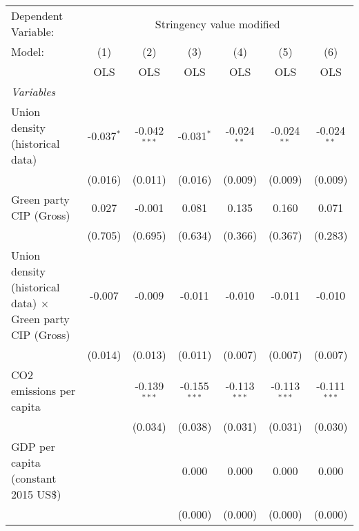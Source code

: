 
\begingroup
\centering
\begin{tabular}{lcccccc}
   \toprule
   Dependent Variable: & \multicolumn{6}{c}{Stringency value modified}\\
   Model:                                                            & (1)          & (2)            & (3)            & (4)            & (5)            & (6)\\  
                                                                     &  OLS         & OLS            & OLS            & OLS            & OLS            & OLS\\  
   \midrule
   \emph{Variables}\\
   Union density (historical data)                                   & -0.037$^{*}$ & -0.042$^{***}$ & -0.031$^{*}$   & -0.024$^{**}$  & -0.024$^{**}$  & -0.024$^{**}$\\   
                                                                     & (0.016)      & (0.011)        & (0.016)        & (0.009)        & (0.009)        & (0.009)\\   
   Green party CIP (Gross)                                           & 0.027        & -0.001         & 0.081          & 0.135          & 0.160          & 0.071\\   
                                                                     & (0.705)      & (0.695)        & (0.634)        & (0.366)        & (0.367)        & (0.283)\\   
   Union density (historical data) $\times$ Green party CIP (Gross)  & -0.007       & -0.009         & -0.011         & -0.010         & -0.011         & -0.010\\   
                                                                     & (0.014)      & (0.013)        & (0.011)        & (0.007)        & (0.007)        & (0.007)\\   
   CO2 emissions per capita                                          &              & -0.139$^{***}$ & -0.155$^{***}$ & -0.113$^{***}$ & -0.113$^{***}$ & -0.111$^{***}$\\   
                                                                     &              & (0.034)        & (0.038)        & (0.031)        & (0.031)        & (0.030)\\   
   GDP per capita (constant 2015 US\$)                               &              &                & 0.000          & 0.000          & 0.000          & 0.000\\   
                                                                     &              &                & (0.000)        & (0.000)        & (0.000)        & (0.000)\\   

\end{tabular}
